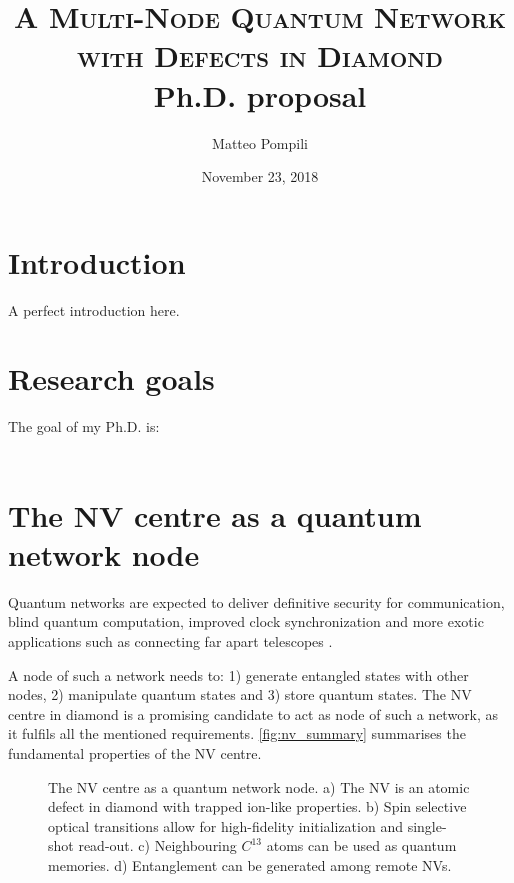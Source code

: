 \documentclass[a4paper, twoside]{article}
\title{
	\huge{\textsc{A Multi-Node Quantum Network\\with Defects in Diamond}}\\
	\vspace{10pt}\Large{Ph.D. proposal}
}
\author{Matteo Pompili}
\date{November 23, 2018}
\begin{document}
\maketitle

\section*{Introduction}
A perfect introduction here.
\blindtext[2]

\setcounter{secnumdepth}{1}
\setcounter{tocdepth}{1}
\tableofcontents

\newpage
\section{Research goals}
The goal of my Ph.D. is:\\\\

\section{The NV centre as a quantum network node}

Quantum networks are expected to deliver definitive security for communication, blind quantum computation, improved clock synchronization and more exotic applications such as connecting far apart telescopes \cite{Wehner2018}.

A node of such a network needs to: 1) generate entangled states with other nodes, 2) manipulate quantum states and 3) store quantum states. The \ac{NV} centre in diamond is a promising candidate to act as node of such a network, as it fulfils all the mentioned requirements. \autoref{fig:nv_summary} summarises the fundamental properties of the \ac{NV} centre.

\begin{figure}
	\caption{The \ac{NV} centre as a quantum network node. a) The \ac{NV} is an atomic defect in diamond with trapped ion-like properties. b) Spin selective optical transitions allow for high-fidelity initialization and single-shot read-out. c) Neighbouring $C^{13}$ atoms can be used as quantum memories. d) Entanglement can be generated among remote \acp{NV}.}
	\label{fig:nv_summary}
\end{figure}
\end{document}
